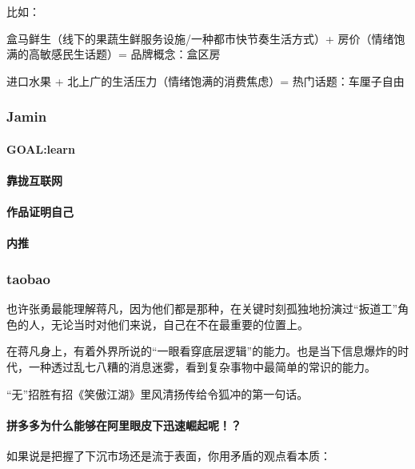 \documentclass[letterpaper,10pt,english]{sphinxmanual}
\begin{document}
比如：

盒马鲜生（线下的果蔬生鲜服务设施/一种都市快节奏生活方式）+
房价（情绪饱满的高敏感民生话题）= 品牌概念：盒区房

进口水果 + 北上广的生活压力（情绪饱满的消费焦虑）= 热门话题：车厘子自由


\subsubsection{Jamin}
\label{\detokenize{chapter_experience/Jamin:jamin}}\label{\detokenize{chapter_experience/Jamin::doc}}

\paragraph{GOAL:learn}
\label{\detokenize{chapter_experience/Jamin:goal-learn}}

\paragraph{靠拢互联网}
\label{\detokenize{chapter_experience/Jamin:id1}}

\paragraph{作品证明自己}
\label{\detokenize{chapter_experience/Jamin:id2}}

\paragraph{内推}
\label{\detokenize{chapter_experience/Jamin:id3}}

\subsubsection{taobao}
\label{\detokenize{chapter_experience/taobao:taobao}}\label{\detokenize{chapter_experience/taobao::doc}}
也许张勇最能理解蒋凡，因为他们都是那种，在关键时刻孤独地扮演过“扳道工”角色的人，无论当时对他们来说，自己在不在最重要的位置上。

在蒋凡身上，有着外界所说的“一眼看穿底层逻辑”的能力。也是当下信息爆炸的时代，一种透过乱七八糟的消息迷雾，看到复杂事物中最简单的常识的能力。

“无”招胜有招《笑傲江湖》里风清扬传给令狐冲的第一句话。


\paragraph{拼多多为什么能够在阿里眼皮下迅速崛起呢！？}
\label{\detokenize{chapter_experience/taobao:id1}}
如果说是把握了下沉市场还是流于表面，你用矛盾的观点看本质：
\end{document}
